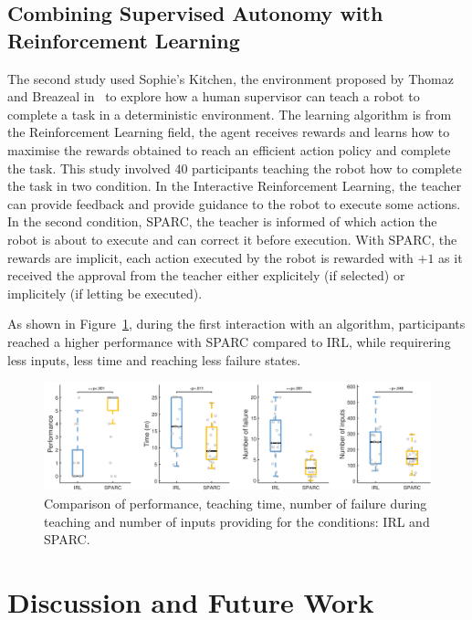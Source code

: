 \documentclass[conference]{IEEEtran}
\begin{document}
\subsection{Combining Supervised Autonomy with Reinforcement Learning}

The second study \cite{senft2017supervised} used Sophie's Kitchen, the
environment proposed by Thomaz and Breazeal in~\cite{thomaz2008teachable} to
explore how a human supervisor can teach a robot to complete a task in a
deterministic environment. The learning algorithm is from the Reinforcement
Learning field, the agent receives rewards and learns how to maximise the
rewards obtained to reach an efficient action policy and complete the task. This
study involved 40 participants teaching the robot how to complete the task in
two condition. In the Interactive Reinforcement Learning, the teacher can
provide feedback and provide guidance to the robot to execute some actions. In
the second condition, SPARC, the teacher is informed of which action the robot
is about to execute and can correct it before execution. With SPARC, the rewards
are implicit, each action executed by the robot is rewarded with $+1$ as it
received the approval from the teacher either explicitely (if selected) or
implicitely (if letting be executed). 

As shown in Figure~\ref{fig:film}, during the first interaction with an
algorithm, participants reached a higher performance with SPARC compared to IRL,
while requirering less inputs, less time and reaching less failure states.

\begin{figure}
    \centering
    \includegraphics[width=0.9\linewidth]{film.pdf}
    \caption{Comparison of performance, teaching time, number of failure during
    teaching and number of inputs providing for the conditions: IRL and SPARC.}
    \label{fig:film}
\end{figure}

\section{Discussion and Future Work}
\end{document}
